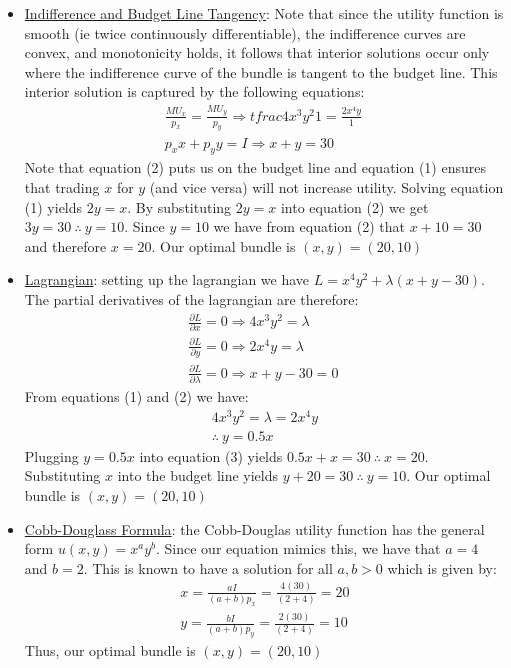 \documentclass{article}
\begin{document}
  \begin{itemize}
    \item  \underline{Indifference and Budget Line Tangency}: Note that since the utility function is smooth (ie twice continuously differentiable), the indifference curves are convex, and monotonicity holds, it follows that interior solutions occur only where the indifference curve of the bundle is tangent to the budget line. This interior solution is captured by the following equations:
    \begin{gather*}
      \frac{MU_{x}}{p_{x}} = \frac{MU_{y}}{p_{y}} \Rightarrow tfrac{4x^{3}y^{2}}{1} = \frac{2x^{4}y}{1} \ \tag{1} \\
      p_{x}x + p_{y}y = I \Rightarrow x + y = 30 \ \tag{2}
    \end{gather*}
    Note that equation (2) puts us on the budget line and equation (1) ensures that trading $x$ for $y$ (and vice versa) will not increase utility. Solving equation (1) yields $2y = x$. By substituting $2y = x$ into equation (2) we get $3y = 30 \ \therefore \ y = 10$. Since $y=10$ we have from equation (2) that $x + 10 = 30$ and therefore $x = 20$. Our optimal bundle is $(x,y) = (20, 10)$
    \item  \underline{Lagrangian}: setting up the lagrangian we have $L = x^{4}y^{2} + \lambda (x + y - 30)$. The partial derivatives of the lagrangian are therefore:
    \begin{gather*}
      \frac{\partial L}{\partial x} = 0 \Rightarrow 4x^{3}y^{2} = \lambda \ \tag{1} \\
      \frac{\partial L}{\partial y} = 0 \Rightarrow 2x^{4}y = \lambda \ \tag{2} \\
      \frac{\partial L}{\partial \lambda} = 0 \Rightarrow x + y - 30 = 0 \ \tag{3}
    \end{gather*}
    From equations (1) and (2) we have:
    \begin{gather*}
      4x^{3}y^{2} = \lambda = 2x^{4}y \\
      \therefore \ y = 0.5x
    \end{gather*}
    Plugging $y = 0.5x$ into equation (3) yields $0.5x + x = 30 \ \therefore \ x = 20$. Substituting $x$ into the budget line yields $y + 20 = 30 \ \therefore \ y = 10$. Our optimal bundle is $(x,y) = (20, 10)$
    \item  \underline{Cobb-Douglass Formula}: the Cobb-Douglas utility function has the general form $u(x,y) = x^{a}y^{b}$. Since our equation mimics this, we have that $a=4$ and $b=2$. This is known to have a solution for all $a,b > 0$ which is given by:
    \begin{gather*}
      x = \frac{aI}{(a+b)p_{x}} = \frac{4(30)}{(2+4)} = 20 \\
      y = \frac{bI}{(a+b)p_{y}} = \frac{2(30)}{(2+4)} = 10
    \end{gather*}
    Thus, our optimal bundle is $(x,y) = (20, 10)$
  \end{itemize}
  \par
\vspace{6mm}
\end{document}
